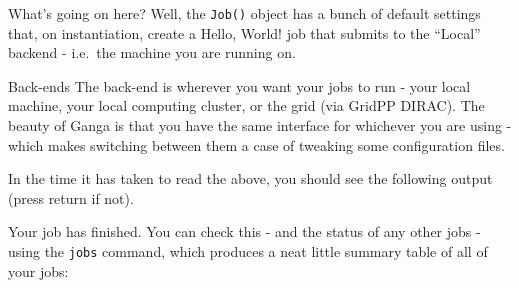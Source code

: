 \begin{Shaded}
\begin{Highlighting}[]
     
     
     
     
     
     
     
\end{Highlighting}
\end{Shaded}

What's going on here? Well, the \texttt{Job()} object has a bunch of
default settings that, on instantiation, create a Hello, World! job that
submits to the ``Local'' backend - i.e.~the machine you are running on.

\begin{infobox}{Back-ends}
The back-end is wherever you want your jobs to run - your local machine,
your local computing cluster, or the grid (via GridPP DIRAC). The beauty
of Ganga is that you have the same interface for whichever you are using
- which makes switching between them a case of tweaking some
configuration files.
\end{infobox}

In the time it has taken to read the above, you should see the following
output (press return if not).

\begin{Shaded}
\begin{Highlighting}[]
     
     
     
     
\end{Highlighting}
\end{Shaded}

Your job has finished. You can check this - and the status of any other
jobs - using the \texttt{jobs} command, which produces a neat little
summary table of all of your jobs:

\begin{Shaded}
\begin{Highlighting}[]
 
 
 
\end{Highlighting}
\end{Shaded}

